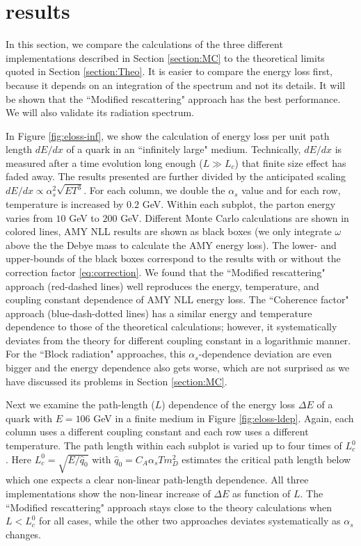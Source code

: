 \documentclass[aps, prc, reprint, amsmath, groupedaddress, nofootinbib]{revtex4-1}
\begin{document}
{\section{results}\label{section:results}
In this section, we compare the calculations of the three different implementations described in Section \ref{section:MC} to the theoretical limits quoted in Section \ref{section:Theo}. 
It is easier to compare the energy loss first, because it depends on an integration of the spectrum and not its details.
It will be shown that the ``Modified rescattering" approach has the best performance. 
We will also validate its radiation spectrum.


In Figure \ref{fig:eloss-inf}, we show the calculation of energy loss per unit path length $dE/dx$ of a quark in an ``infinitely large" medium. 
Technically, $dE/dx$ is measured after a time evolution long enough ($L\gg L_c$) that finite size effect has faded away.
The results presented are further divided by the anticipated scaling $dE/dx \propto \alpha_s^2 \sqrt{ET^3}$.
For each column, we double the $\alpha_s$ value and for each row, temperature is increased by $0.2$ GeV. 
Within each subplot, the parton energy varies from $10$ GeV to $200$ GeV.
Different Monte Carlo calculations are shown in colored lines, AMY NLL results are shown as black boxes (we only integrate $\omega$ above the the Debye mass to calculate the AMY energy loss). 
The lower- and upper-bounds of the black boxes correspond to the results with or without the correction factor \ref{eq:correction}.
We found that the ``Modified rescattering" approach (red-dashed lines) well reproduces the energy, temperature, and coupling constant dependence of AMY NLL energy loss.
The ``Coherence factor" approach (blue-dash-dotted lines) has a similar energy and temperature dependence to those of the theoretical calculations; however, it systematically deviates from the theory for different coupling constant in a logarithmic manner.
For the ``Block radiation" approaches, this $\alpha_s$-dependence deviation are even bigger and the energy dependence also gets worse, which are not surprised as we have discussed its problems in Section \ref{section:MC}.

Next we examine the path-length ($L$) dependence of the energy loss $\Delta E$ of a quark with $E = 106$ GeV in a finite medium in Figure \ref{fig:eloss-ldep}.
Again, each column uses a different coupling constant and each row uses a different temperature. 
The path length within each subplot is varied up to four times of $L_c^0$.
Here $L_c^0 = \sqrt{E/\hat{q}_0}$ with $\hat{q}_0 = C_A \alpha_s T m_D^2$ estimates the critical path length below which one expects a clear non-linear path-length dependence.
All three implementations show the non-linear increase of $\Delta E$ as function of $L$.
The ``Modified rescattering" approach stays close to the theory calculations when $L<L_c^0$ for all cases, while the other two approaches deviates systematically as $\alpha_s$ changes.

}
\end{document}

